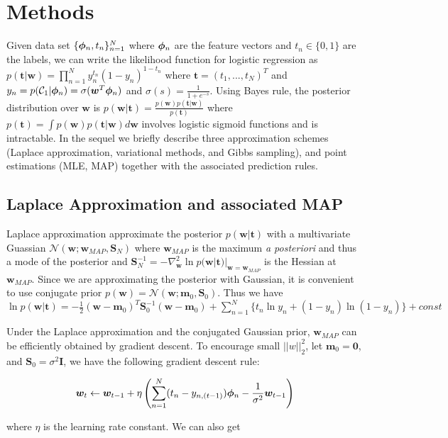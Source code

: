 \section{Methods}
Given data set $\{\bm{\phi}_n, t_n\}_{n=1}^N$ where $\bm{\phi}_n$ are the feature
vectors and $t_n\in \{0,1\}$ are the labels, we can write the likelihood
function for logistic regression as $p(\bm{t}|\bm{w}) = \prod_{n=1}^N
y_n^{t_n} (1-y_n)^{1-t_n}$ where $\bm{t} = (t_1,...,t_N)^T$ and
$y_n=p(\mathcal{C}_1|\bm{\phi}_n) = \sigma(\bm{w}^T \bm{\phi}_n)$ and $\sigma(s) =
\frac{1}{1+e^{-s}}$. Using Bayes rule, the posterior distribution over
$\bm{w}$ is $p(\bm{w}|\bm{t}) = \frac{p(\bm{w}) p(\bm{t}|\bm{w})}{p(\bm{t})}$
where $p(\bm{t}) = \int p(\bm{w})p(\bm{t}|\bm{w}) d\bm{w}$ involves logistic
sigmoid functions and is intractable. In the sequel we briefly describe three
approximation schemes (Laplace approximation, variational methods, and Gibbs
sampling), and point estimations (MLE, MAP) together with the associated
prediction rules.

\subsection{Laplace Approximation and associated MAP}

Laplace approximation approximate the posterior $p(\bm{w}|\bm{t})$ with a
multivariate Guassian $\mathcal{N}(\bm{w}; \bm{w}_{MAP}, \bm{S}_N)$ where
$\bm{w}_{MAP}$ is the maximum {\it a posteriori} and thus a mode of the
posterior and $\bm{S}_N^{-1} = -\nabla^2_{\bm{w}} \ln
p(\bm{w}|\bm{t})|_{\bm{w} = \bm{w}_{MAP}}$ is the Hessian at $\bm{w}_{MAP}$.
Since we are approximating the posterior with Gaussian, it is convenient to
use conjugate prior $p(\bm{w}) = \mathcal{N}(\bm{w};\bm{m}_0,\bm{S}_0)$. Thus
we have $\ln p(\bm{w}|\bm{t}) = -\frac{1}{2}(\bm{w}-\bm{m}_0)^T
\bm{S}_0^{-1}(\bm{w}-\bm{m}_0) + \sum_{n=1}^N\{t_n \ln y_n +(1-y_n) \ln
(1-y_n)\} + const$

Under the Laplace approximation and the conjugated Gaussian prior, $\bm{w}_{MAP}$
can be efficiently obtained by gradient descent. To encourage small
$||w||^2_2$, let $\bm{m}_0 = \bm{0}$, and $\bm{S}_0 = \sigma^2 \bm{I}$, we
have the following gradient descent rule: 

\begin{equation}
\bm{w}_t \leftarrow \bm{w}_{t-1} + \eta\left( \sum_{n=1}^N (t_n - y_{n,(t-1)}) \bm{\phi}_n -
\frac{1}{\sigma^2}\bm{w}_{t-1} \right)
\end{equation}

where $\eta$ is the learning rate constant. We can also get


